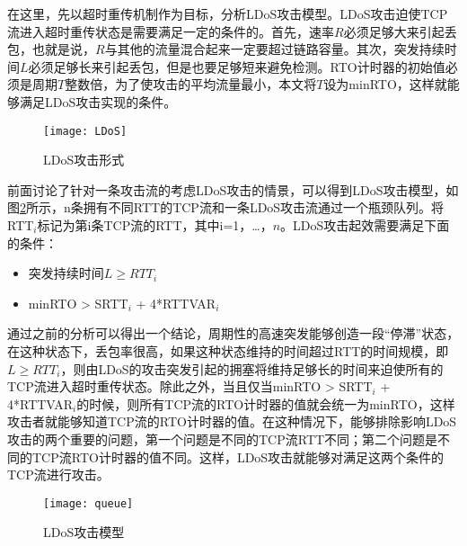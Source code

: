 在这里，先以超时重传机制作为目标，分析LDoS攻击模型。LDoS攻击迫使TCP流进入超时重传状态是需要满足一定的条件的。首先，速率$R$必须足够大来引起丢包，也就是说，$R$与其他的流量混合起来一定要超过链路容量。其次，突发持续时间$L$必须足够长来引起丢包，但是也要足够短来避免检测。RTO计时器的初始值必须是周期$T$整数倍，为了使攻击的平均流量最小，本文将$T$设为minRTO，这样就能够满足LDoS攻击实现的条件。

\begin{figure}
    \centering
    \texttt{[image: LDoS]}
    \caption{LDoS攻击形式}
    \label{fig:LDoS}
\end{figure}

前面讨论了针对一条攻击流的考虑LDoS攻击的情景，可以得到LDoS攻击模型，如图\ref{fig:model}所示，n条拥有不同RTT的TCP流和一条LDoS攻击流通过一个瓶颈队列。将RTT$_{i}$标记为第i条TCP流的RTT，其中i=1，…，$n$。LDoS攻击起效需要满足下面的条件：
\begin{itemize}
    \item 突发持续时间$L \geq RTT_i $
    \item minRTO > SRTT$_i$ + 4*RTTVAR$_i$
\end{itemize}

通过之前的分析可以得出一个结论，周期性的高速突发能够创造一段“停滞”状态，在这种状态下，丢包率很高，如果这种状态维持的时间超过RTT的时间规模，即$L \geq RTT_i$，则由LDoS的攻击突发引起的拥塞将维持足够长的时间来迫使所有的TCP流进入超时重传状态。除此之外，当且仅当minRTO > SRTT$_i$ + 4*RTTVAR$_i$的时候，则所有TCP流的RTO计时器的值就会统一为minRTO，这样攻击者就能够知道TCP流的RTO计时器的值。在这种情况下，能够排除影响LDoS攻击的两个重要的问题，第一个问题是不同的TCP流RTT不同；第二个问题是不同的TCP流RTO计时器的值不同。这样，LDoS攻击就能够对满足这两个条件的TCP流进行攻击。





\begin{figure}
    \centering
    \texttt{[image: queue]}
    \caption{LDoS攻击模型}
    \label{fig:model}
\end{figure}

